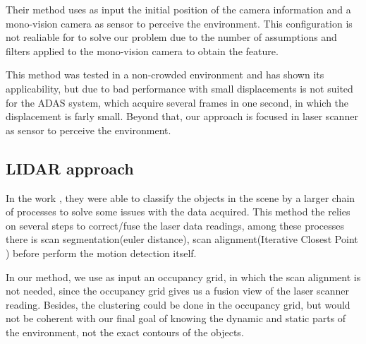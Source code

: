Their method uses as input the initial position of the camera information and a mono-vision camera as sensor to perceive the environment. This configuration is not realiable for to solve our problem due to the number of assumptions and filters applied to the mono-vision camera to obtain the feature.

This method was tested in a non-crowded environment and has shown its applicability, but due to bad performance with small displacements is not suited for the ADAS system, which acquire several frames in one second, in which the displacement is farly small. Beyond that, our approach is focused in laser scanner as sensor to perceive the environment.

\subsection{LIDAR approach}

In the work \cite{4650636}, they were able to classify the objects in the scene by a larger chain of processes to solve some issues with the data acquired. This method the relies on several steps to correct/fuse the laser data readings, among these processes there is scan segmentation(euler distance), scan alignment(Iterative Closest Point \cite{10.1109/34.121791}) before perform the motion detection itself. 


In our method, we use as input an occupancy grid, in which the scan alignment is not needed, since the occupancy grid gives us a fusion view of the laser scanner reading. Besides, the clustering could be done in the occupancy grid, but would not be coherent with our final goal of knowing the dynamic and static parts of the environment, not the exact contours of the objects.


